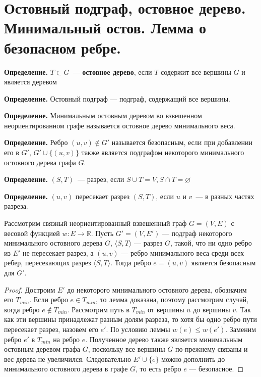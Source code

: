 \setcounter{section}{57}
\section{Остовный подграф, остовное дерево. Минимальный остов. Лемма о безопасном ребре.
}

\textbf{Определение.} $T \subset G$~--- \textbf{остовное дерево}, если $T$ содержит все вершины $G$ и является деревом

\textbf{Определение.} Остовный подграф — подграф, содержащий все вершины.

\textbf{Определение.} Минимальным остовным деревом во взвешенном неориентированном графе называется остовное дерево минимального веса.

\textbf{Определение.} Ребро $ ( u, v ) \notin G' $ называется безопасным, если при добавлении его в $ G' $, $ G' \cup \{ ( u, v ) \}$ также является подграфом некоторого минимального остовного дерева графа $ G $.

\textbf{Определение.} $(S,T)$~--- разрез, если $S \cup T = V, S \cap T = \varnothing$

\textbf{Определение.} $(u,v)$ пересекает разрез $(S,T)$, если $u$ и $v$~--- в разных частях разреза. 

\begin{theorem}
Рассмотрим связный неориентированный взвешенный граф $ G = ( V, E ) $ с весовой функцией $w : E \to \mathbb{R}$. Пусть $ G' = ( V, E' ) $ --- подграф некоторого минимального остовного дерева $ G $, $ \langle S, T \rangle $ --- разрез $ G $, такой, что ни одно ребро из $ E' $ не пересекает разрез, а $ ( u, v ) $ --- ребро минимального веса среди всех ребер, пересекающих разрез $ \langle S, T \rangle $. Тогда ребро $ e = ( u, v ) $ является безопасным для $ G'$.
\end{theorem}

\begin{proof}
Достроим $ E' $ до некоторого минимального остовного дерева, обозначим его $T_{min}$. Если ребро $e \in T_{min}$, то лемма доказана, поэтому рассмотрим случай, когда ребро $e \notin T_{min}$. Рассмотрим путь в $T_{min}$ от вершины $u$ до вершины $v$. Так как эти вершины принадлежат разным долям разреза, то хотя бы одно ребро пути пересекает разрез, назовем его $e'$. По условию леммы $w(e) \leqslant w(e')$. Заменим ребро $e'$ в $T_{min}$ на ребро $e$. Полученное дерево также является минимальным остовным деревом графа $G$, поскольку все вершины $G$ по-прежнему связаны и вес дерева не увеличился. Следовательно $E' \cup \{e\} $ можно дополнить до минимального остовного дерева в графе $G$, то есть ребро $e$ --- безопасное. 
\end{proof}

